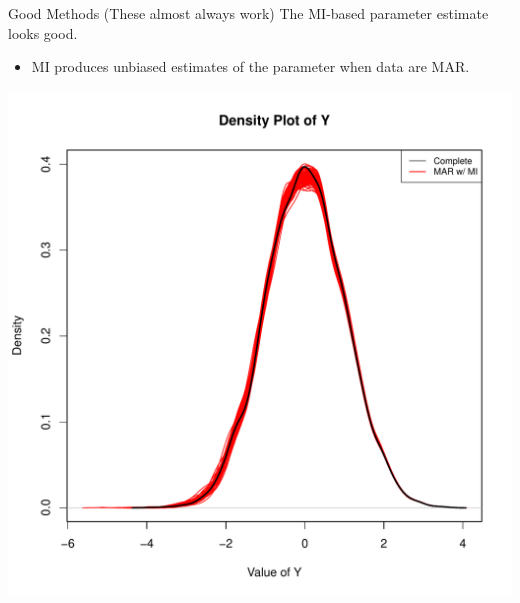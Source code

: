 \documentclass{beamer}\usepackage[]{graphicx}\usepackage[]{color}
\newenvironment{knitrout}{}{} %
\begin{document}
\begin{frame}{Good Methods (These almost always 
    work)}
The MI-based parameter estimate looks good.
\begin{itemize}
\item MI produces unbiased estimates of the parameter when data are MAR.
\end{itemize}

\pagebreak

\begin{knitrout}\footnotesize
{}\color{fgcolor}

{\centering \includegraphics[width=0.65\linewidth]{figure/unnamed-chunk-25-1} 

}



\end{knitrout}

\end{frame}

\end{document}
